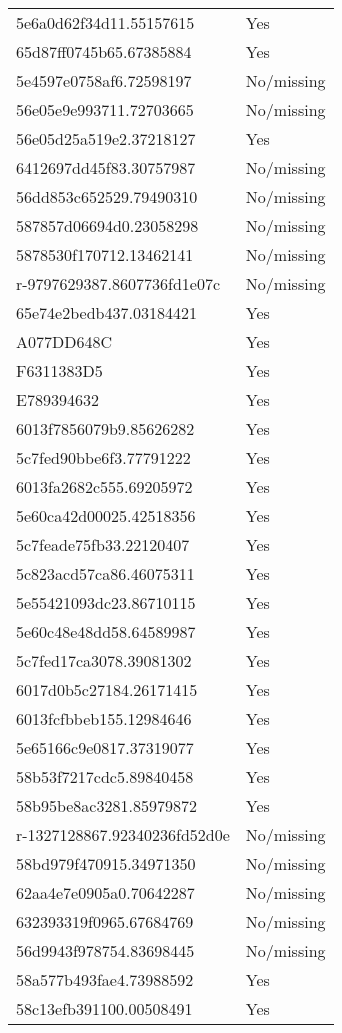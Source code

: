 \begin{tabular}{ll}
5e6a0d62f34d11.55157615 & Yes \\
65d87ff0745b65.67385884 & Yes \\
5e4597e0758af6.72598197 & No/missing \\
56e05e9e993711.72703665 & No/missing \\
56e05d25a519e2.37218127 & Yes \\
6412697dd45f83.30757987 & No/missing \\
56dd853c652529.79490310 & No/missing \\
587857d06694d0.23058298 & No/missing \\
5878530f170712.13462141 & No/missing \\
r-9797629387.8607736fd1e07c & No/missing \\
65e74e2bedb437.03184421 & Yes \\
A077DD648C & Yes \\
F6311383D5 & Yes \\
E789394632 & Yes \\
6013f7856079b9.85626282 & Yes \\
5c7fed90bbe6f3.77791222 & Yes \\
6013fa2682c555.69205972 & Yes \\
5e60ca42d00025.42518356 & Yes \\
5c7feade75fb33.22120407 & Yes \\
5c823acd57ca86.46075311 & Yes \\
5e55421093dc23.86710115 & Yes \\
5e60c48e48dd58.64589987 & Yes \\
5c7fed17ca3078.39081302 & Yes \\
6017d0b5c27184.26171415 & Yes \\
6013fcfbbeb155.12984646 & Yes \\
5e65166c9e0817.37319077 & Yes \\
58b53f7217cdc5.89840458 & Yes \\
58b95be8ac3281.85979872 & Yes \\
r-1327128867.92340236fd52d0e & No/missing \\
58bd979f470915.34971350 & No/missing \\
62aa4e7e0905a0.70642287 & No/missing \\
632393319f0965.67684769 & No/missing \\
56d9943f978754.83698445 & No/missing \\
58a577b493fae4.73988592 & Yes \\
58c13efb391100.00508491 & Yes \\

\end{tabular}
